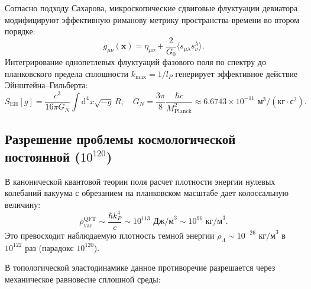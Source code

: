 \documentclass[11pt,a4paper]{article}
\theoremstyle{definition}
\theoremstyle{remark}
\begin{document}
Согласно подходу Сахарова, микроскопические сдвиговые флуктуации девиатора модифицируют эффективную риманову метрику пространства-времени во втором порядке:
\begin{equation}
    g_{\mu\nu}(\mathbf{x}) = \eta_{\mu\nu} + \frac{2}{G_0} \langle s_{\mu\lambda} s^\lambda_\nu \rangle.
    \label{eq:sakharov_metric}
\end{equation}
Интегрирование однопетлевых флуктуаций фазового поля по спектру до планковского предела сплошности $k_{\max} = 1/l_P$ генерирует эффективное действие Эйнштейна--Гильберта:
\begin{equation}
    S_{\mathrm{EH}}[g] = \frac{c^3}{16\pi G_N} \int \mathrm{d}^4 x \sqrt{-g} \, R, \quad G_N = \frac{3\pi}{8} \frac{\hbar c}{M_{\mathrm{Planck}}^2} \approx 6.6743 \times 10^{-11}\text{ м}^3/(\text{кг}\cdot\text{с}^2).
\end{equation}

\subsection{Разрешение проблемы космологической постоянной ($10^{120}$)}
В канонической квантовой теории поля расчет плотности энергии нулевых колебаний вакуума с обрезанием на планковском масштабе дает колоссальную величину:
\begin{equation}
    \rho_{\mathrm{vac}}^{\mathrm{QFT}} \sim \frac{\hbar k_P^4}{c} \sim 10^{113}\text{ Дж/м}^3 \sim 10^{96}\text{ кг/м}^3.
\end{equation}
Это превосходит наблюдаемую плотность темной энергии $\rho_\Lambda \sim 10^{-26}\text{ кг/м}^3$ в $10^{122}$ раз (парадокс $10^{120}$).

В топологической эластодинамике данное противоречие разрешается через механическое равновесие сплошной среды:
\end{document}
